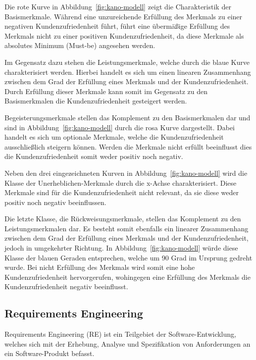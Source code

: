 Die rote Kurve in Abbildung~\ref{fig:kano-modell} zeigt die Charakteristik der Basismerkmale.
Während eine unzureichende Erfüllung des Merkmals zu einer negativen Kundenzufriedenheit führt, führt eine übermäßige Erfüllung des Merkmals nicht zu einer positiven Kundenzufriedenheit, da diese Merkmale als absolutes Minimum (Must-be) angesehen werden.

Im Gegensatz dazu stehen die Leistungsmerkmale, welche durch die blaue Kurve charakterisiert werden.
Hierbei handelt es sich um einen linearen Zusammenhang zwischen dem Grad der Erfüllung eines Merkmals und der Kundenzufriedenheit.
Durch Erfüllung dieser Merkmale kann somit im Gegensatz zu den Basismerkmalen die Kundenzufriedenheit gesteigert werden.

Begeisterungsmerkmale stellen das Komplement zu den Basismerkmalen dar und sind in Abbildung~\ref{fig:kano-modell} durch die rosa Kurve dargestellt.
Dabei handelt es sich um optionale Merkmale, welche die Kundenzufriedenheit ausschließlich steigern können.
Werden die Merkmale nicht erfüllt beeinflusst dies die Kundenzufriedenheit somit weder positiv noch negativ.

Neben den drei eingezeichneten Kurven in Abbildung~\ref{fig:kano-modell} wird die Klasse der Unerheblichen-Merkmale durch die x-Achse charakterisiert.
Diese Merkmale sind für die Kundenzufriedenheit nicht relevant, da sie diese weder positiv noch negativ beeinflussen.

Die letzte Klasse, die Rückweisungsmerkmale, stellen das Komplement zu den Leistungsmerkmalen dar.
Es besteht somit ebenfalls ein linearer Zusammenhang zwischen dem Grad der Erfüllung eines Merkmals und der Kundenzufriedenheit, jedoch in umgekehrter Richtung.
In Abbildung~\ref{fig:kano-modell} würde diese Klasse der blauen Geraden entsprechen, welche um 90 Grad im Ursprung gedreht wurde.
Bei nicht Erfüllung des Merkmals wird somit eine hohe Kundenzufriedenheit hervorgerufen, wohingegen eine Erfüllung des Merkmals die Kundenzufriedenheit negativ beeinflusst.
\newline


\subsection{Requirements Engineering}
Requirements Engineering (RE) ist ein Teilgebiet der Software-Entwicklung, welches sich mit der Erhebung, Analyse und Spezifikation von Anforderungen an ein Software-Produkt befasst.
